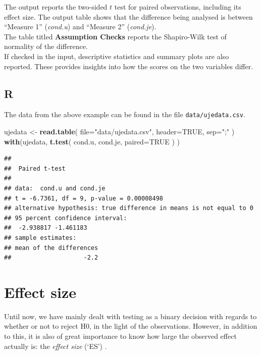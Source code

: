\documentclass[
]{book}
\newenvironment{Shaded}{\begin{snugshade}}{\end{snugshade}}
\newcommand{\DataTypeTok}[1]{\textcolor[rgb]{0.13,0.29,0.53}{#1}}
\newcommand{\KeywordTok}[1]{\textcolor[rgb]{0.13,0.29,0.53}{\textbf{#1}}}
\newcommand{\NormalTok}[1]{#1}
\newcommand{\OtherTok}[1]{\textcolor[rgb]{0.56,0.35,0.01}{#1}}
\newcommand{\StringTok}[1]{\textcolor[rgb]{0.31,0.60,0.02}{#1}}
\begin{document}
The output reports the two-sided \(t\) test for paired observations, including its effect size. The output table shows that the difference being analysed is between ``Measure 1'' (\emph{cond.u}) and ``Measure 2'' (\emph{cond.je}).\\
The table titled \textbf{Assumption Checks} reports the Shapiro-Wilk test of normality of the difference.\\
If checked in the input, descriptive statistics and summary plots are also reported. These provides insights into how the scores on the two variables differ.

\hypertarget{sec:R-ttest-paired}{%
\subsection{R}\label{sec:R-ttest-paired}}

The data from the above example can be found in the file \texttt{data/ujedata.csv}.

\begin{Shaded}
\begin{Highlighting}[]
\NormalTok{ujedata \textless{}{-}}\StringTok{ }\KeywordTok{read.table}\NormalTok{( }\DataTypeTok{file=}\StringTok{"data/ujedata.csv"}\NormalTok{, }\DataTypeTok{header=}\OtherTok{TRUE}\NormalTok{, }\DataTypeTok{sep=}\StringTok{";"}\NormalTok{ )}
\KeywordTok{with}\NormalTok{(ujedata, }\KeywordTok{t.test}\NormalTok{( cond.u, cond.je, }\DataTypeTok{paired=}\OtherTok{TRUE}\NormalTok{ ) )}
\end{Highlighting}
\end{Shaded}

\begin{verbatim}
## 
##  Paired t-test
## 
## data:  cond.u and cond.je
## t = -6.7361, df = 9, p-value = 0.00008498
## alternative hypothesis: true difference in means is not equal to 0
## 95 percent confidence interval:
##  -2.938817 -1.461183
## sample estimates:
## mean of the differences 
##                    -2.2
\end{verbatim}

\hypertarget{sec:ttest-effectsize}{%
\section{Effect size}\label{sec:ttest-effectsize}}

Until now, we have mainly dealt with testing as a binary
decision with regards to whether or not to reject H0, in the light
of the observations. However, in addition to this, it is also of great importance
to know how large the observed effect actually is: the \emph{effect size} (`ES')
\citep{Cohen88, Thom02, Naka07}.
\end{document}
